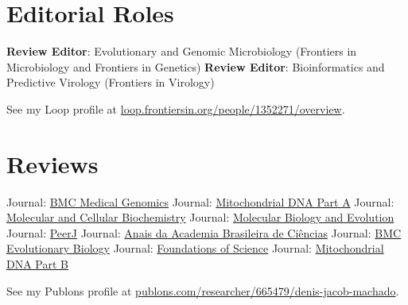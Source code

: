 
\section{Editorial Roles}

	    {\textbf{Review Editor}: Evolutionary and Genomic Microbiology (Frontiers in Microbiology and Frontiers in Genetics)}
	\cvline{---}
	    {\textbf{Review Editor}: Bioinformatics and Predictive Virology (Frontiers in Virology)}

\vspace{0.5em}

See my Loop profile at  \href{https://loop.frontiersin.org/people/1352271/overview}{loop.frontiersin.org/people/1352271/overview}.

\section{Reviews}

	    {Journal: \href{https://bmcmedgenomics.biomedcentral.com/?gclid=CjwKCAjwrPCGBhALEiwAUl9X02eq5n6VLJ16fWlJrdFIVyGvqligO-_5N1em5soDXeFFqL7AyHJ6CxoCCX4QAvD_BwE}{BMC Medical Genomics}}
		{Journal: \href{https://www.tandfonline.com/loi/imdn20}{Mitochondrial DNA Part A}}
	\cvline{---}
	    {Journal: \href{https://www.springer.com/journal/11010/?gclid=Cj0KCQjwoJX8BRCZARIsAEWBFMLKBYnPcerYvwBvi0o_0fPoNuCnGz_5XU9lYKC91oSA7LozsZKev0saAuNLEALw_wcB}{Molecular and Cellular Biochemistry}}
	\cvline{---}
		{Journal: \href{https://academic.oup.com/mbe}{Molecular Biology and Evolution}}
	\cvline{---}
		{Journal: \href{https://peerj.com/}{PeerJ}}
	    {Journal: \href{https://www.scielo.br/scielo.php?script=sci_serial&pid=0001-3765&lng=en&nrm=iso}{Anais da Academia Brasileira de Ciências}}
	\cvline{---}
		{Journal: \href{https://bmcevolbiol.biomedcentral.com/}{BMC Evolutionary Biology}}
	\cvline{---}
		{Journal: \href{https://www.springer.com/journal/10699}{Foundations of Science}}
	\cvline{---}
		{Journal: \href{https://www.tandfonline.com/toc/tmdn20/current}{Mitochondrial DNA Part B}}

\vspace{0.5em}

See my Publons profile at  \href{https://publons.com/researcher/665479/denis-jacob-machado/}{publons.com/researcher/665479/denis-jacob-machado}.
